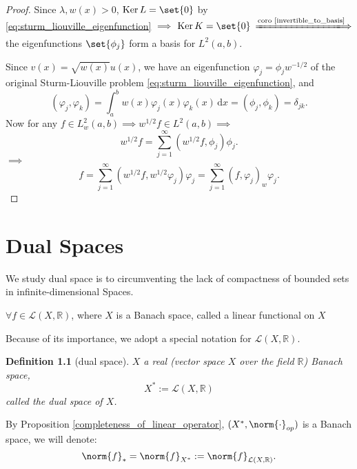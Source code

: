 \documentclass[a4paper]{book}
\newtheorem{defi}[thm]{Definition}
\newcommand\diff{\,\mathrm{d}}
\newcommand\ximplies\xLongrightarrow
\DeclarePairedDelimiter{\norm}\lVert\rVert
\DeclarePairedDelimiter{\set}\lbrace\rbrace
\def\L{\mathcal{L}}
\def\R{\mathbb{R}}
\DeclareMathOperator{\Ker}{Ker}
\begin{document}
\begin{proof}
     Since $\lambda, w(x) > 0$, $\Ker L = \set{0}$ by \eqref{eq:sturm_liouville_eigenfunction} $\implies$ $\Ker K = \set{0}$ $\ximplies{\text{coro \ref{invertible_to_basis}}}$ the eigenfunctions $\set{\phi_j}$ form a basis for $L^2(a,b)$.

     Since $v(x)=\sqrt{w(x)}u(x)$, we have an eigenfunction $\varphi_j=\phi_j w^{-1/2}$ of the original Sturm-Liouville problem \eqref{eq:sturm_liouville_eigenfunction}, and
     \[(\varphi_j,\varphi_k)=\int_a^b w(x)\varphi_j(x)\varphi_k(x) \diff x = (\phi_j, \phi_k) = \delta_{jk}.\]
     Now for any $f \in L_w^2(a,b) \implies w^{1/2}f \in L^2(a,b) \implies$
     \[w^{1/2}f = \sum_{j=1}^{\infty} (w^{1/2}f,\phi_j)\phi_j.\]
     $\implies$
     \[f=\sum_{j=1}^{\infty}(w^{1/2}f, w^{1/2}\varphi_j)\varphi_j = \sum_{j=1}^{\infty}(f,\varphi_j)_w\varphi_j.\]
 \end{proof}
 \chapter{Dual Spaces}
 We study dual space is to circumventing the lack of compactness of bounded sets in infinite-dimensional Spaces.
 \begin{myDef}
     $\forall f \in \L(X, \R)$, where $X$ is a Banach space, called a linear functional on $X$
 \end{myDef}
 Because of its importance, we adopt a special notation for $\L(X, \R)$.
 \begin{defi}[dual space]
     $X$ a real (vector space $X$ over the field $\R$) Banach space,
     \[X^* := \L(X,\R)\]
     called the dual space of $X$.
 \end{defi}
 By Proposition \ref{completeness_of_linear_operator}, $(X^*, \norm{\cdot}_{op})$ is a Banach space, we will denote:
 \[\norm{f}_* = \norm{f}_{X^*} := \norm{f}_{\L(X,\R)}.\]
\end{document}
